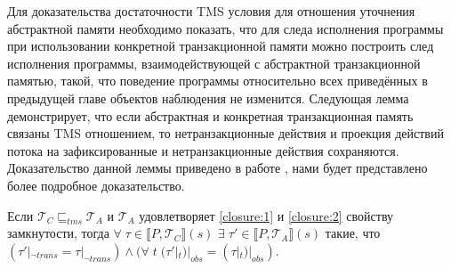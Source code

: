 Для доказательства достаточности TMS условия для отношения уточнения абстрактной памяти необходимо показать, что для следа исполнения программы при использовании конкретной транзакционной памяти можно построить след исполнения программы, взаимодействующей с абстрактной транзакционной памятью, такой, что поведение программы относительно всех приведённых в предыдущей главе объектов  наблюдения не изменится. Следующая лемма демонстрирует, что если абстрактная и конкретная транзакционная память связаны TMS отношением, то нетранзакционные действия и проекция действий потока на зафиксированные и нетранзакционные действия сохраняются. Доказательство данной леммы приведено в работе \cite{tms_article}, нами будет представлено более подробное доказательство.     
\begin{lemma}\label{sufficiency5}
Если $\mathcal{T}_C \sqsubseteq_{tms} \mathcal{T}_A$ и $\mathcal{T}_A$ удовлетворяет \ref{closure:1} и \ref{closure:2} свойству замкнутости, тогда $\forall \; \tau \in \llbracket P, \mathcal{T}_C\rrbracket(s)$ $\exists \; \tau' \in \llbracket P, \mathcal{T}_A \rrbracket(s)$ такие, что $(\tau'|_{\neg trans} = \tau|_{\neg trans}) \land (\forall \; t \; (\tau'|_t)|_{obs} = (\tau|_t)|_{obs})$.\end{lemma}
